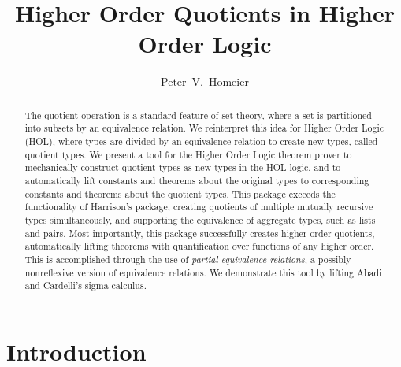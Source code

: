 \documentclass[envcountsame,runningheads]{llncs}
\newcommand{\quotient}{partial equivalence}
\begin{document}
\title{Higher Order Quotients in Higher Order Logic}


\author{Peter~V.~Homeier}



\maketitle

\begin{abstract}
The quotient operation is a standard feature of set theory, where
a set is partitioned into subsets by an equivalence relation.
We reinterpret this idea for Higher Order Logic (HOL), where types are
divided by an equivalence relation to create new types, called
quotient types.
We present a tool for the Higher Order Logic theorem prover
to mechanically construct quotient types as
new types in the HOL logic,
and to automatically lift constants and 
theorems about the original types
to corresponding constants and theorems about the quotient types.
This package exceeds the functionality of Harrison's package,
creating quotients of multiple mutually recursive types simultaneously,
and supporting the equivalence of aggregate types, such as lists and pairs.
Most importantly,
this package successfully
creates higher-order quotients, automatically lifting
theorems with quantification over functions
of any higher order.
This is accomplished through the
use
of {\it \quotient{} relations},
a possibly nonreflexive version of equivalence relations.
We demonstrate this tool by lifting Abadi and Cardelli's sigma calculus.
\end{abstract}


%
\section{Introduction}
%
\end{document}
